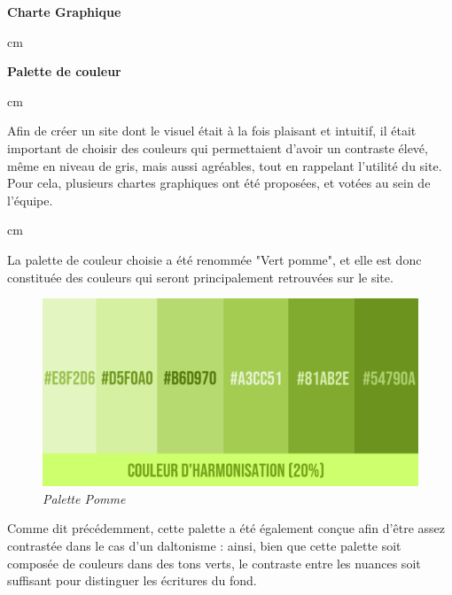 \documentclass[12pt]{article}
\begin{document}
    \begin{LARGE}
        \textbf{Charte Graphique}
    \end{LARGE}

     cm

    \begin{large}
        \textbf{Palette de couleur}
    \end{large}

     cm
    
    Afin de créer un site dont le visuel était à la fois plaisant et intuitif, il était important de choisir des couleurs qui permettaient d'avoir un contraste élevé, même en niveau de gris, mais aussi agréables, tout en rappelant l'utilité du site.\\
    Pour cela, plusieurs chartes graphiques ont été proposées, et votées au sein de l'équipe.
    
     cm
    
    La palette de couleur choisie a été renommée "Vert pomme", et elle est donc constituée des couleurs qui seront principalement retrouvées sur le site.

    \begin{figure}[h!]
        \centering
        \includegraphics[scale = 0.45]{static/Pomme Palette 1.png}
        \small{\emph{Palette Pomme}}
        \label{fig:Palette}
    \end{figure}

    Comme dit précédemment, cette palette a été également conçue afin d'être assez contrastée dans le cas d'un daltonisme : ainsi, bien que cette palette soit composée de couleurs dans des tons verts, le contraste entre les nuances soit suffisant pour distinguer les écritures du fond.
    
\end{document}
